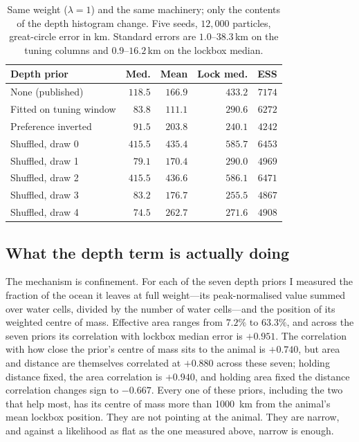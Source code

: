 \documentclass[conference]{IEEEtran}
\begin{document}
\begin{table}[t]
\caption{Same weight ($\lambda = 1$) and the same machinery; only the contents
of the depth histogram change. Five seeds, $12{,}000$ particles, great-circle
error in \si{\km}. Standard errors are $1.0$--$38.3$\,\si{\km} on the tuning
columns and $0.9$--$16.2$\,\si{\km} on the lockbox median.}
\label{tab:habitat}
\centering
\begin{tabular}{@{}lrrrr@{}}
\toprule
Depth prior & Med. & Mean & Lock med. & ESS \\
\midrule
None (published)        & $118.5$ & $166.9$ & $433.2$ & $7174$ \\
Fitted on tuning window & $83.8$  & $111.1$ & $290.6$ & $6272$ \\
Preference inverted     & $91.5$  & $203.8$ & $240.1$ & $4242$ \\
Shuffled, draw 0        & $415.5$ & $435.4$ & $585.7$ & $6453$ \\
Shuffled, draw 1        & $79.1$  & $170.4$ & $290.0$ & $4969$ \\
Shuffled, draw 2        & $415.5$ & $436.6$ & $586.1$ & $6471$ \\
Shuffled, draw 3        & $83.2$  & $176.7$ & $255.5$ & $4867$ \\
Shuffled, draw 4        & $74.5$  & $262.7$ & $271.6$ & $4908$ \\
\bottomrule
\end{tabular}
\end{table}

\subsection{What the depth term is actually doing}

The mechanism is confinement. For each of the seven depth priors I measured the
fraction of the ocean it leaves at full weight---its peak-normalised value
summed over water cells, divided by the number of water cells---and the
position of its weighted centre of mass. Effective area ranges from $7.2\%$ to
$63.3\%$, and across the seven priors its correlation with lockbox median error
is $+0.951$. The correlation with how close the prior's centre of mass sits to
the animal is $+0.740$, but area and distance are themselves correlated at
$+0.880$ across these seven; holding distance fixed, the area correlation is
$+0.940$, and holding area fixed the distance correlation changes sign to
$-0.667$. Every one of these priors, including the two that help most, has its
centre of mass more than \SI{1000}{\km} from the animal's mean lockbox
position. They are not pointing at the animal. They are narrow, and against a
likelihood as flat as the one measured above, narrow is enough.
\end{document}
